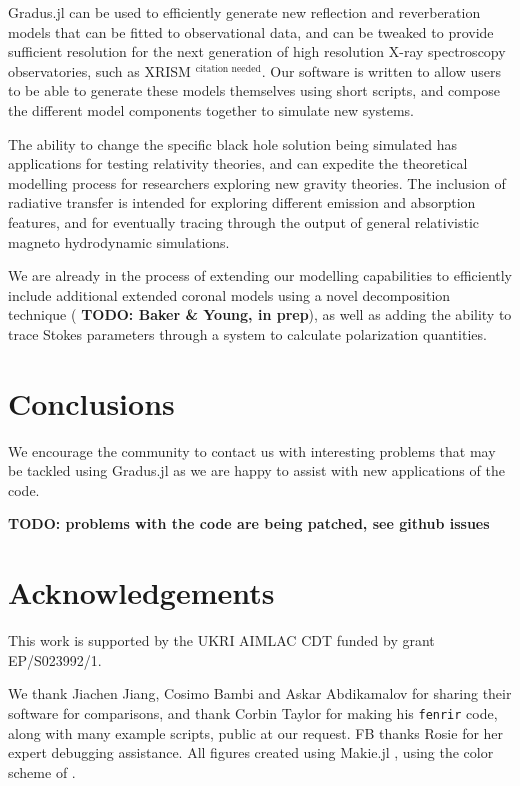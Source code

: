\documentclass[fleqn,usenatbib]{mnras}
\newcommand{\citneeded}{{\bf \color{red} $^{\text{citation needed}}$}}
\newcommand{\todo}[1]{{\noindent \bf \color{red} TODO: #1}}
\newcommand{\Gradus}{Gradus.jl }
\begin{document}
\Gradus can be used to efficiently generate new reflection and reverberation
models that can be fitted to observational data, and can be tweaked to provide
sufficient resolution for the next generation of high resolution X-ray
spectroscopy observatories, such as XRISM\citneeded. Our software is written to
allow users to be able to generate these models themselves using short scripts,
and compose the different model components together to simulate new systems.

The ability to change the specific black hole solution being simulated has
applications for testing relativity theories, and can expedite the theoretical
modelling process for researchers exploring new gravity theories. The inclusion
of radiative transfer is intended for exploring different emission and
absorption features, and for eventually tracing through the output of general
relativistic magneto hydrodynamic simulations.

We are already in the process of extending our modelling capabilities to
efficiently include additional extended coronal models using a novel
decomposition technique (\todo{Baker \& Young, in prep}), as well as adding
the ability to trace Stokes parameters through a system to calculate
polarization quantities.

\section{Conclusions}
\label{sec:conclusion}

We encourage the community to contact us with interesting problems that may be tackled using \Gradus as we are happy to assist with new applications of the code.

\todo{problems with the code are being patched, see github issues}

\section*{Acknowledgements}
This work is supported by the UKRI AIMLAC CDT funded by grant EP/S023992/1.

We thank Jiachen Jiang, Cosimo Bambi and Askar Abdikamalov for sharing their
software for comparisons, and thank Corbin Taylor for making his
\texttt{fenrir} code, along with many example scripts, public at our request. FB thanks Rosie for her expert debugging assistance. All figures created using Makie.jl \citep{DanischKrumbiegel2021}, using the color scheme of \cite{wong_points_2011}.
\end{document}
